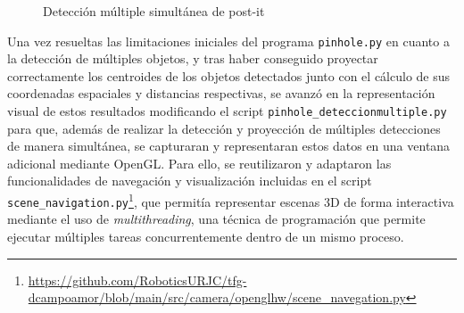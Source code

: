    \begin{figure}[H]
   \centering
   \begin{center}
     \subcapcentertrue
     \hspace{2mm}
   \end{center}
   \caption{Detección múltiple simultánea de post-it}
   \label{fig:deteccion_multiple_ptos}
  \end{figure}
  
Una vez resueltas las limitaciones iniciales del programa \verb|pinhole.py| en cuanto a la detección de múltiples objetos, y tras haber conseguido proyectar correctamente los centroides de los objetos detectados junto con el cálculo de sus coordenadas espaciales y distancias respectivas, se avanzó en la representación visual de estos resultados modificando el script \verb|pinhole_deteccionmultiple.py| para que, además de realizar la detección y proyección de múltiples detecciones de manera simultánea, se capturaran y representaran estos datos en una ventana adicional mediante OpenGL. Para ello, se reutilizaron y adaptaron las funcionalidades de navegación y visualización incluidas en el script \verb|scene_navigation.py|\footnote{\url{https://github.com/RoboticsURJC/tfg-dcampoamor/blob/main/src/camera/openglhw/scene_navegation.py}}, que permitía representar escenas 3D de forma interactiva mediante el uso de \textit{multithreading}, una técnica de programación que permite ejecutar múltiples tareas concurrentemente dentro de un mismo proceso.


